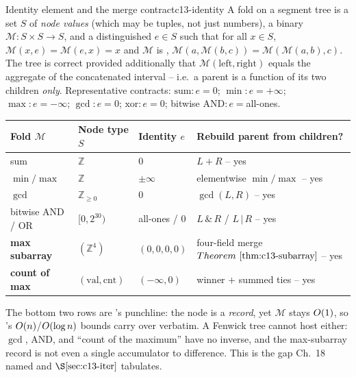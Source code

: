 \begin{definition}{Identity element and the merge contract}{c13-identity}
A fold on a segment tree is a set \(S\) of \emph{node values} (which may be
tuples, not just numbers), a binary  \(\mathcal{M}:S\times S\to S\),
and a distinguished  \(e\in S\) such that for all \(x\in S\),
\(\mathcal{M}(x,e)=\mathcal{M}(e,x)=x\) and \(\mathcal{M}\) is
, \(\mathcal{M}(a,\mathcal{M}(b,c))=\mathcal{M}(\mathcal{M}(a,b),c)\).
The tree is correct provided additionally that \(\mathcal{M}(\text{left},
\text{right})\) equals the aggregate of the concatenated interval -- i.e.\ a
parent is a function of its two children \emph{only}.  Representative contracts:
\(\text{sum}:e{=}0\); \(\min:e{=}+\infty\); \(\max:e{=}{-}\infty\);
\(\gcd:e{=}0\); \(\text{xor}:e{=}0\); bitwise \(\text{AND}:e{=}\)all-ones.
\end{definition}

\begin{center}\renewcommand{\arraystretch}{1.25}
\begin{tabular}{@{}l l l l@{}}
\toprule
\textbf{Fold \(\mathcal{M}\)} & \textbf{Node type \(S\)} & \textbf{Identity \(e\)} & \textbf{Rebuild parent from children?}\\
\midrule
sum                  & \(\mathbb{Z}\)          & \(0\)        & \(L{+}R\) -- yes \\
\(\min/\max\)        & \(\mathbb{Z}\)          & \(\pm\infty\) & elementwise \(\min/\max\) -- yes \\
\(\gcd\)             & \(\mathbb{Z}_{\ge0}\)   & \(0\)        & \(\gcd(L,R)\) -- yes \\
bitwise AND / OR     & \([0,2^{30})\)          & all-ones / \(0\) & \(L\,\&\,R\) / \(L\,|\,R\) -- yes \\
\textbf{max subarray} & \((\mathbb{Z}^4)\)      & \((0,0,0,0)\) & four-field merge \(\thmref{c13-subarray}\) -- yes \\
\textbf{count of max} & \((\text{val},\text{cnt})\) & \((-\infty,0)\) & winner \(+\) summed ties -- yes \\
\bottomrule
\end{tabular}\end{center}

\noindent The bottom two rows are 's punchline: the node is
a \emph{record}, yet \(\mathcal{M}\) stays \(O(1)\), so
's \(O(n)\)/\(O(\log n)\) bounds carry over verbatim.
A Fenwick tree cannot host either: \(\gcd\), AND, and ``count of the maximum''
have no inverse, and the max-subarray record is not even a single accumulator to
difference.  This is the gap Ch.~18 named and \(\secref{c13-iter}\) tabulates.

